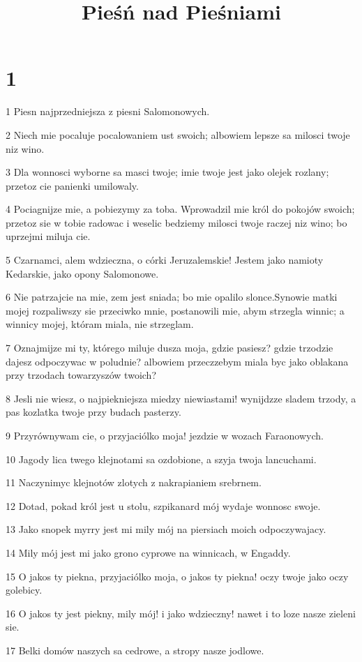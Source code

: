 

\title{Pieśń nad Pieśniami}


\chapter{1}

\par 1 Piesn najprzedniejsza z piesni Salomonowych.
\par 2 Niech mie pocaluje pocalowaniem ust swoich; albowiem lepsze sa milosci twoje niz wino.
\par 3 Dla wonnosci wyborne sa masci twoje; imie twoje jest jako olejek rozlany; przetoz cie panienki umilowaly.
\par 4 Pociagnijze mie, a pobiezymy za toba. Wprowadzil mie król do pokojów swoich; przetoz sie w tobie radowac i weselic bedziemy milosci twoje raczej niz wino; bo uprzejmi miluja cie.
\par 5 Czarnamci, alem wdzieczna, o córki Jeruzalemskie! Jestem jako namioty Kedarskie, jako opony Salomonowe.
\par 6 Nie patrzajcie na mie, zem jest sniada; bo mie opalilo slonce.Synowie matki mojej rozpaliwszy sie przeciwko mnie, postanowili mie, abym strzegla winnic; a winnicy mojej, któram miala, nie strzeglam.
\par 7 Oznajmijze mi ty, którego miluje dusza moja, gdzie pasiesz? gdzie trzodzie dajesz odpoczywac w poludnie? albowiem przeczzebym miala byc jako oblakana przy trzodach towarzyszów twoich?
\par 8 Jesli nie wiesz, o najpiekniejsza miedzy niewiastami! wynijdzze sladem trzody, a pas kozlatka twoje przy budach pasterzy.
\par 9 Przyrównywam cie, o przyjaciólko moja! jezdzie w wozach Faraonowych.
\par 10 Jagody lica twego klejnotami sa ozdobione, a szyja twoja lancuchami.
\par 11 Naczynimyc klejnotów zlotych z nakrapianiem srebrnem.
\par 12 Dotad, pokad król jest u stolu, szpikanard mój wydaje wonnosc swoje.
\par 13 Jako snopek myrry jest mi mily mój na piersiach moich odpoczywajacy.
\par 14 Mily mój jest mi jako grono cyprowe na winnicach, w Engaddy.
\par 15 O jakos ty piekna, przyjaciólko moja, o jakos ty piekna! oczy twoje jako oczy golebicy.
\par 16 O jakos ty jest piekny, mily mój! i jako wdzieczny! nawet i to loze nasze zieleni sie.
\par 17 Belki domów naszych sa cedrowe, a stropy nasze jodlowe.

